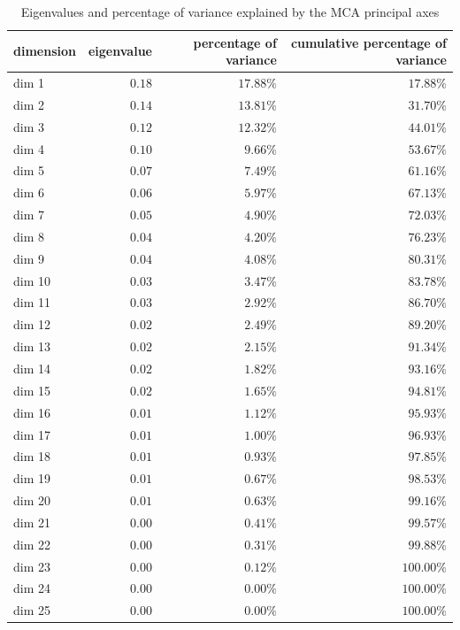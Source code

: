 \documentclass[
  letterpaper,
  DIV=11,
  numbers=noendperiod]{scrartcl}
\begin{document}
\hypertarget{tbl-eig}{}
\begin{longtable}{lrrr}
\caption{\label{tbl-eig}Eigenvalues and percentage of variance explained by the MCA principal
axes }\tabularnewline

\toprule
dimension & eigenvalue & percentage of variance & cumulative percentage of variance \\ 
\midrule
dim 1 & $0.18$ & $17.88\%$ & $17.88\%$ \\ 
dim 2 & $0.14$ & $13.81\%$ & $31.70\%$ \\ 
dim 3 & $0.12$ & $12.32\%$ & $44.01\%$ \\ 
dim 4 & $0.10$ & $9.66\%$ & $53.67\%$ \\ 
dim 5 & $0.07$ & $7.49\%$ & $61.16\%$ \\ 
dim 6 & $0.06$ & $5.97\%$ & $67.13\%$ \\ 
dim 7 & $0.05$ & $4.90\%$ & $72.03\%$ \\ 
dim 8 & $0.04$ & $4.20\%$ & $76.23\%$ \\ 
dim 9 & $0.04$ & $4.08\%$ & $80.31\%$ \\ 
dim 10 & $0.03$ & $3.47\%$ & $83.78\%$ \\ 
dim 11 & $0.03$ & $2.92\%$ & $86.70\%$ \\ 
dim 12 & $0.02$ & $2.49\%$ & $89.20\%$ \\ 
dim 13 & $0.02$ & $2.15\%$ & $91.34\%$ \\ 
dim 14 & $0.02$ & $1.82\%$ & $93.16\%$ \\ 
dim 15 & $0.02$ & $1.65\%$ & $94.81\%$ \\ 
dim 16 & $0.01$ & $1.12\%$ & $95.93\%$ \\ 
dim 17 & $0.01$ & $1.00\%$ & $96.93\%$ \\ 
dim 18 & $0.01$ & $0.93\%$ & $97.85\%$ \\ 
dim 19 & $0.01$ & $0.67\%$ & $98.53\%$ \\ 
dim 20 & $0.01$ & $0.63\%$ & $99.16\%$ \\ 
dim 21 & $0.00$ & $0.41\%$ & $99.57\%$ \\ 
dim 22 & $0.00$ & $0.31\%$ & $99.88\%$ \\ 
dim 23 & $0.00$ & $0.12\%$ & $100.00\%$ \\ 
dim 24 & $0.00$ & $0.00\%$ & $100.00\%$ \\ 
dim 25 & $0.00$ & $0.00\%$ & $100.00\%$ \\ 
\bottomrule
\end{longtable}
\end{document}
